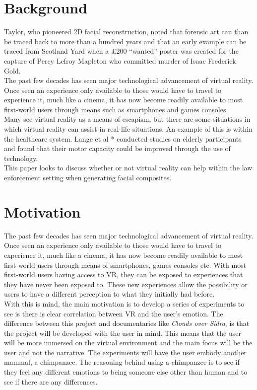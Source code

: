 \documentclass[12pt]{report}
\begin{document}
\section{Background}

Taylor, who pioneered 2D facial reconstruction, noted that forensic art can than be traced back to more than a hundred years\cite{Ref2} and that an early example can be traced from Scotland Yard when a £200 “wanted” poster was created for the capture of Percy Lefroy Mapleton who committed murder of Isaac Frederick Gold. 
\\

The past few decades has seen major technological advancement of virtual reality. Once seen an experience only available to those would have to travel to experience it, much like a cinema, it has now become readily available to most ﬁrst-world users through means such as smartphones and games consoles.
\\

Many see virtual reality as a means of escapism, but there are some situations in which virtual reality can assist in real-life situations. An example of this is within the healthcare system. Lange et al  * conducted studies on elderly participants and found that their motor capacity could be improved through the use of technology.
\\
 
This paper looks to discuss whether or not virtual reality can help within the law enforcement setting when generating facial composites.

\section{Motivation}
The past few decades has seen major technological advancement of virtual reality. Once seen an experience only available to those would have to travel to experience it, much like a cinema, it has now become readily available to most first-world users through means of smartphones, games consoles etc. With most first-world users having access to VR, they can be exposed to experiences that they have never been exposed to. These new experiences allow the possibility or users to have a different perception to what they initially had before.  
\\

With this is mind, the main motivation is to develop a series of experiments to see is there is clear correlation between VR and the user’s emotion. The difference between this project and documentaries like \textit{Clouds over Sidra}, is that the project will be developed with the user in mind. This means that the user will be more immersed on the virtual environment and the main focus will be the user and not the narrative. The experiments will have the user embody another mammal, a chimpanzee. The reasoning behind using a chimpanzee is to see if they feel any different emotions to being someone else other than human and to see if there are any differences. 
\end{document}
